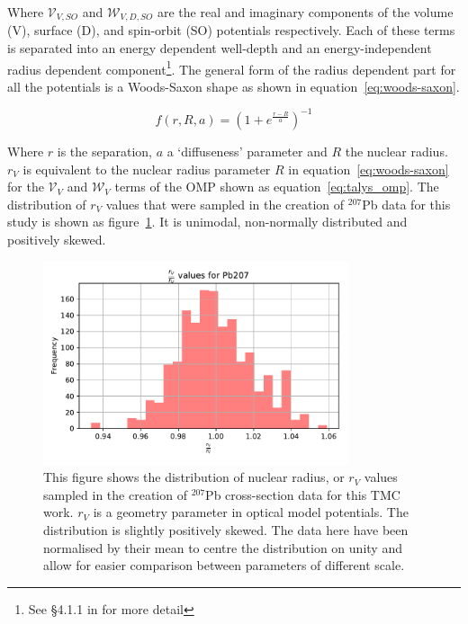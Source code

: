 Where $\mathcal{V}_{V,SO}$ and $\mathcal{W}_{V,D,SO}$ are the real and imaginary components of the volume (V), surface (D), and spin-orbit (SO) potentials respectively. Each of these terms is separated into an energy dependent well-depth and an energy-independent radius dependent component\footnote{See §4.1.1 in \cite{TALYS2017} for more detail}. The general form of the radius dependent part for all the potentials is a Woods-Saxon shape \cite{Woods1954} as shown in equation~\ref{eq:woods-saxon}.

\begin{equation}
  \label{eq:woods-saxon}
  f(r,R,a) = \left(1 + e^{\frac{r-R}{a}}\right)^{-1}
\end{equation}

Where $r$ is the separation, $a$ a `diffuseness' parameter and $R$ the nuclear radius. $r_{V}$ is equivalent to the nuclear radius parameter $R$ in equation~\ref{eq:woods-saxon} for the $\mathcal{V}_{V}$ and $\mathcal{W}_{V}$ terms of the OMP shown as equation~\ref{eq:talys_omp}. The distribution of $r_{V}$ values that were sampled in the creation of $^{207}$Pb data for this study is shown as figure~\ref{fig:pb207_rvadjust_hist}. It is unimodal, non-normally distributed and positively skewed. 

\begin{figure}[H]
  \centering
	\includegraphics[width=0.8\textwidth]{rvadjust_param_Pb207_histogram}
	\caption{This figure shows the distribution of nuclear radius, or $r_{V}$ values sampled in the creation of $^{207}$Pb cross-section data for this TMC work. $r_{V}$ is a geometry parameter in optical model potentials. The distribution is slightly positively skewed. The data here have been normalised by their mean to centre the distribution on unity and allow for easier comparison between parameters of different scale.}
	\label{fig:pb207_rvadjust_hist}
\end{figure}

